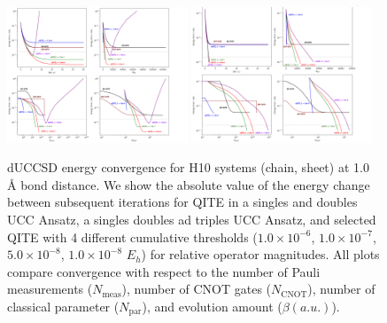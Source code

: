 \documentclass[aip,jcp,amsmath,amssymb, reprint]{revtex4-1}
\begin{document}
\begin{figure}[htbp]
\centering
\includegraphics[width=0.48\textwidth]{sqite_paper/Chain 1.0 A.png}
\includegraphics[width=0.48\textwidth]{sqite_paper/Sheet 1.0 A.png}
\vspace{1em} %
\caption{dUCCSD energy convergence for H10 systems (chain, sheet) at 1.0 Å bond distance. We show the absolute value of the energy change between subsequent iterations for QITE in a singles and doubles UCC Ansatz, a singles doubles ad triples UCC Ansatz, and selected QITE with 4 different cumulative thresholds ($1.0 \times 10^{-6}$, $1.0 \times 10^{-7}$, $5.0 \times 10^{-8}$, $1.0 \times 10^{-8}$ $E_h$) for relative operator magnitudes. All plots compare convergence with respect to the number of Pauli measurements ($N_\mathrm{meas}$), number of CNOT gates ($N_\mathrm{CNOT}$), number of classical parameter ($N_\mathrm{par}$), and evolution amount ($\beta (a. u.)$).}
\label{fig:ene_plot_1.0A}
\end{figure}

\end{document}
